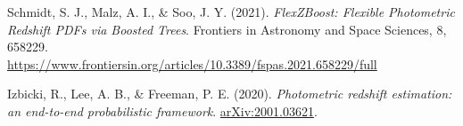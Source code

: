 \documentclass{article}
\begin{document}
\begin{thebibliography}{9}

Schmidt, S. J., Malz, A. I., \& Soo, J. Y. (2021). \textit{FlexZBoost: Flexible Photometric Redshift PDFs via Boosted Trees}. Frontiers in Astronomy and Space Sciences, 8, 658229. \\
\href{https://www.frontiersin.org/articles/10.3389/fspas.2021.658229/full}{https://www.frontiersin.org/articles/10.3389/fspas.2021.658229/full}



Izbicki, R., Lee, A. B., \& Freeman, P. E. (2020). \textit{Photometric redshift estimation: an end-to-end probabilistic framework}. \href{https://arxiv.org/abs/2001.03621}{arXiv:2001.03621}.


\end{thebibliography}
\end{document}
